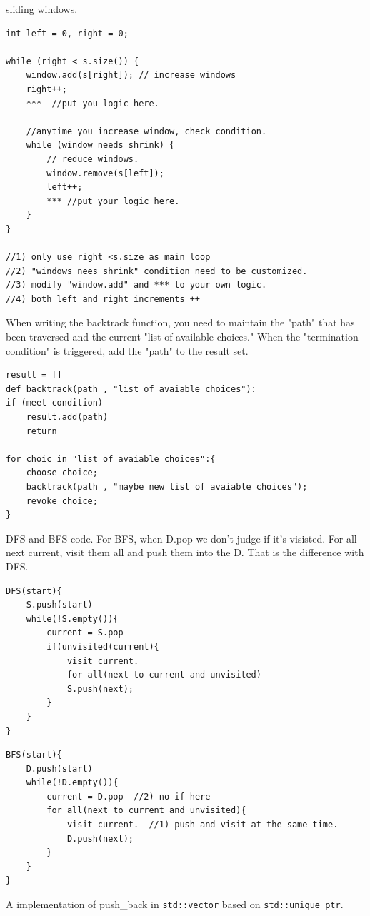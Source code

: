 \documentclass[a4paper,11pt,twoside]{book}
\begin{document}
	\par sliding windows. 
	
\begin{lstlisting}
int left = 0, right = 0;

while (right < s.size()) {
	window.add(s[right]); // increase windows
	right++;
	***  //put you logic here.
	
	//anytime you increase window, check condition. 
	while (window needs shrink) {
		// reduce windows.
		window.remove(s[left]);
		left++;
		*** //put your logic here. 
	}
}

//1) only use right <s.size as main loop
//2) "windows nees shrink" condition need to be customized. 
//3) modify "window.add" and *** to your own logic. 
//4) both left and right increments ++	
\end{lstlisting}	
	
	\par When writing the backtrack function, you need to maintain the "path" that has been traversed and the current "list of available choices." When the "termination condition" is triggered, add the "path" to the result set.
	
\begin{lstlisting}
result = []
def backtrack(path , "list of avaiable choices"):
if (meet condition)
	result.add(path)
	return

for choic in "list of avaiable choices":{
	choose choice;
	backtrack(path , "maybe new list of avaiable choices");
	revoke choice;
}		
\end{lstlisting}	
		
	\par DFS and BFS code. For BFS, when D.pop we don't judge if it's visisted.  For all next current, visit them all and push them into the D. That is the difference with DFS.
\begin{lstlisting}
DFS(start){
	S.push(start)  
	while(!S.empty()){
		current = S.pop
		if(unvisited(current){
			visit current.
			for all(next to current and unvisited)
			S.push(next);
		}
	}
}		
\end{lstlisting}	
	
\begin{lstlisting} 
BFS(start){
	D.push(start)  
	while(!D.empty()){
		current = D.pop  //2) no if here
		for all(next to current and unvisited){
			visit current.  //1) push and visit at the same time. 
			D.push(next);
		}
	}
}	
\end{lstlisting}	
	
	
	\par A implementation of push\_back in \texttt{std::vector} based on \texttt{std::unique\_ptr}. 
	
\end{document}
